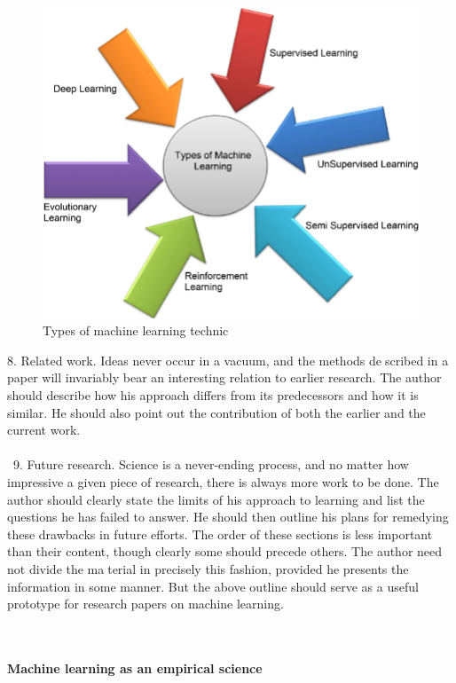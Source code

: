\documentclass{article}
\begin{document}
\begin{figure}
    \centering
   \includegraphics[width=0.8\linewidth]{Types-of-machine-learning-techniques.png}
       \caption{Types of machine learning technic}
    \label{fig:Diffrent type of machine learning}
\end{figure}
8. Related work. Ideas never occur in a vacuum, and the methods described in a paper will invariably bear an interesting relation to earlier
research. The author should describe how his approach differs from
its predecessors and how it is similar. He should also point out the
contribution of both the earlier and the current work.\\\\\
9. Future research. Science is a never-ending process, and no matter how
impressive a given piece of research, there is always more work to be
done. The author should clearly state the limits of his approach to
learning and list the questions he has failed to answer. He should then
outline his plans for remedying these drawbacks in future efforts.
The order of these sections is less important than their content, though
clearly some should precede others. The author need not divide the material in precisely this fashion, provided he presents the information in
some manner. But the above outline should serve as a useful prototype for
research papers on machine learning.\\\\\

\begin{small}
\textbf{Machine learning as an empirical science}
\end{small}\\
\end{document}
